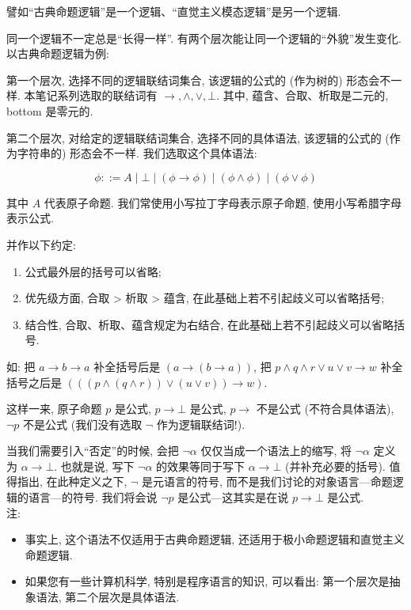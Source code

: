 \documentclass{article}
\def\a{\alpha}
\begin{document}
譬如``古典命题逻辑''是一个逻辑、``直觉主义模态逻辑''是另一个逻辑. 

同一个逻辑不一定总是``长得一样''. 有两个层次能让同一个逻辑的``外貌''发生变化. 以古典命题逻辑为例:

第一个层次, 选择不同的逻辑联结词集合, 该逻辑的公式的 (作为树的) 形态会不一样. 本笔记系列选取的联结词有 $\to,\land,\lor,\bot$. 其中, 蕴含、合取、析取是二元的, bottom 是零元的.

第二个层次, 对给定的逻辑联结词集合, 选择不同的具体语法, 该逻辑的公式的 (作为字符串的) 形态会不一样. 我们选取这个具体语法:

$$
\phi ::= A \mid \bot \mid (\phi \to \phi) \mid (\phi \land \phi) \mid (\phi \lor \phi)
$$ 

其中 $A$ 代表原子命题. 我们常使用小写拉丁字母表示原子命题, 使用小写希腊字母表示公式.

并作以下约定: 
\begin{enumerate}
\item 公式最外层的括号可以省略;
\item 优先级方面, 合取 > 析取 > 蕴含, 在此基础上若不引起歧义可以省略括号;
\item 结合性, 合取、析取、蕴含规定为右结合, 在此基础上若不引起歧义可以省略括号.
\end{enumerate}
如: 把 $a \to b \to a$ 补全括号后是 $(a \to (b \to a))$, 把 
$p \land q \land r \lor u \lor v \to w$ 补全括号之后是 
$(((p \land (q \land r)) \lor (u \lor v)) \to w)$.

这样一来, 原子命题 $p$ 是公式, $p \to \bot$ 是公式, $p \to$ 不是公式 (不符合具体语法), $\neg p$ 不是公式 (我们没有选取 $\neg$ 作为逻辑联结词!).

当我们需要引入``否定''的时候, 会把 $\neg \a$ 仅仅当成一个语法上的缩写, 将 $\neg \a$ 定义为 $\a \to \bot$. 也就是说, 写下 $\neg \a$ 的效果等同于写下 $\a \to \bot$ (并补充必要的括号). 值得指出, 在此种定义之下, $\neg$ 是元语言的符号, 而不是我们讨论的对象语言---命题逻辑的语言---的符号. 我们将会说 $\neg p$ 是公式---这其实是在说 $p \to \bot$ 是公式.\\

注: 
\begin{itemize}
	\item 事实上, 这个语法不仅适用于古典命题逻辑, 还适用于极小命题逻辑和直觉主义命题逻辑.
	\item 如果您有一些计算机科学, 特别是程序语言的知识, 可以看出: 第一个层次是抽象语法, 第二个层次是具体语法.
\end{itemize}
\end{document}

